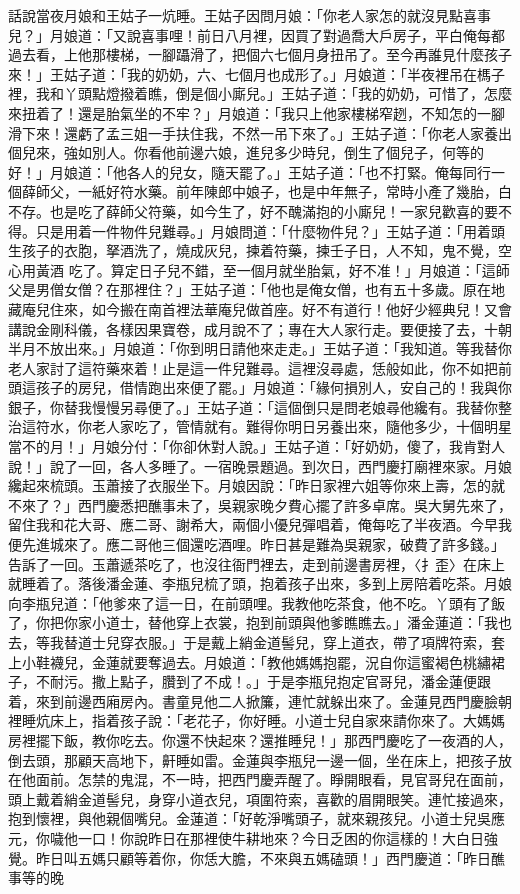 話說當夜月娘和王姑子一炕睡。王姑子因問月娘：「你老人家怎的就沒見點喜事兒？」月娘道：「又說喜事哩！前日八月裡，因買了對過喬大戶房子，平白俺每都過去看，上他那樓梯，一腳躡滑了，把個六七個月身扭吊了。至今再誰見什麼孩子來！」王姑子道：「我的奶奶，六、七個月也成形了。」月娘道：「半夜裡吊在榪子裡，我和丫頭點燈撥着瞧，倒是個小廝兒。」王姑子道：「我的奶奶，可惜了，怎麼來扭着了！還是胎氣坐的不牢？」月娘道：「我只上他家樓梯窄趔，不知怎的一腳滑下來！還虧了孟三姐一手扶住我，不然一吊下來了。」王姑子道：「你老人家養出個兒來，強如別人。你看他前邊六娘，進兒多少時兒，倒生了個兒子，何等的好！」月娘道：「他各人的兒女，隨天罷了。」王姑子道：「也不打緊。俺每同行一個薛師父，一紙好符水藥。前年陳郎中娘子，也是中年無子，常時小產了幾胎，白不存。也是吃了薛師父符藥，如今生了，好不醜滿抱的小廝兒！一家兒歡喜的要不得。只是用着一件物件兒難尋。」月娘問道：「什麼物件兒？」王姑子道：「用着頭生孩子的衣胞，拏酒洗了，燒成灰兒，揀着符藥，揀壬子日，人不知，鬼不覺，空心用黃酒 吃了。算定日子兒不錯，至一個月就坐胎氣，好不准！」月娘道：「這師父是男僧女僧？在那裡住？」王姑子道：「他也是俺女僧，也有五十多歲。原在地藏庵兒住來，如今搬在南首裡法華庵兒做首座。好不有道行！他好少經典兒！又會講說金剛科儀，各樣因果寶卷，成月說不了；專在大人家行走。要便接了去，十朝半月不放出來。」月娘道：「你到明日請他來走走。」王姑子道：「我知道。等我替你老人家討了這符藥來着！止是這一件兒難尋。這裡沒尋處，恁般如此，你不如把前頭這孩子的房兒，借情跑出來便了罷。」月娘道：「緣何損別人，安自己的！我與你銀子，你替我慢慢另尋便了。」王姑子道：「這個倒只是問老娘尋他纔有。我替你整治這符水，你老人家吃了，管情就有。難得你明日另養出來，隨他多少，十個明星當不的月！」月娘分付：「你卻休對人說。」王姑子道：「好奶奶，傻了，我肯對人說！」說了一回，各人多睡了。一宿晚景題過。到次日，西門慶打廟裡來家。月娘纔起來梳頭。玉蕭接了衣服坐下。月娘因說：「昨日家裡六姐等你來上壽，怎的就不來了？」西門慶悉把醮事未了，吳親家晚夕費心擺了許多卓席。吳大舅先來了，留住我和花大哥、應二哥、謝希大，兩個小優兒彈唱着，俺每吃了半夜酒。今早我便先進城來了。應二哥他三個還吃酒哩。昨日甚是難為吳親家，破費了許多錢。」告訴了一回。玉蕭遞茶吃了，也沒往衙門裡去，走到前邊書房裡，〈扌歪〉在床上就睡着了。落後潘金蓮、李瓶兒梳了頭，抱着孩子出來，多到上房陪着吃茶。月娘向李瓶兒道：「他爹來了這一日，在前頭哩。我教他吃茶食，他不吃。丫頭有了飯了，你把你家小道士，替他穿上衣裳，抱到前頭與他爹瞧瞧去。」潘金蓮道：「我也去，等我替道士兒穿衣服。」于是戴上綃金道髻兒，穿上道衣，帶了項牌符索，套上小鞋襪兒，金蓮就要奪過去。月娘道：「教他媽媽抱罷，況自你這蜜褐色桃繡裙子，不耐污。撒上點子，臢到了不成！。」于是李瓶兒抱定官哥兒，潘金蓮便跟着，來到前邊西廂房內。書童見他二人掀簾，連忙就躲出來了。金蓮見西門慶臉朝裡睡炕床上，指着孩子說：「老花子，你好睡。小道士兒自家來請你來了。大媽媽房裡擺下飯，教你吃去。你還不快起來？還推睡兒！」那西門慶吃了一夜酒的人，倒去頭，那顧天高地下，鼾睡如雷。金蓮與李瓶兒一邊一個，坐在床上，把孩子放在他面前。怎禁的鬼混，不一時，把西門慶弄醒了。睜開眼看，見官哥兒在面前，頭上戴着綃金道髻兒，身穿小道衣兒，項圍符索，喜歡的眉開眼笑。連忙接過來，抱到懷裡，與他親個嘴兒。金蓮道：「好乾淨嘴頭子，就來親孩兒。小道士兒吳應元，你噦他一口！你說昨日在那裡使牛耕地來？今日乏困的你這樣的！大白日強覺。昨日叫五媽只顧等着你，你恁大膽，不來與五媽磕頭！」西門慶道：「昨日醮事等的晚
